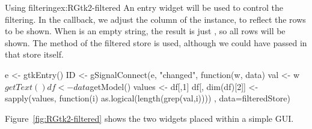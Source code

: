 \begin{example}{Using filtering}{ex:RGtk2-filtered}
An entry widget will be used to control the filtering. In the
callback, we adjust the  column of the
 instance, to reflect the rows to be shown. When
 is an empty string, the result  is just
, so all rows will be shown. The
 method of the filtered store is used, although we
could have passed in that store itself.
\begin{Schunk}
\begin{Sinput}
 e <- gtkEntry()
 ID <- gSignalConnect(e, "changed", function(w, data) {
   val <- w$getText()
   df <- data$getModel()
   values <- df[,1]
   df[, dim(df)[2]] <- sapply(values, function(i) 
                              as.logical(length(grep(val,i))))
 },
                      data=filteredStore)
\end{Sinput}
\end{Schunk}


Figure~\ref{fig:RGtk2-filtered} shows the two widgets placed within a
simple GUI.
\end{example}


